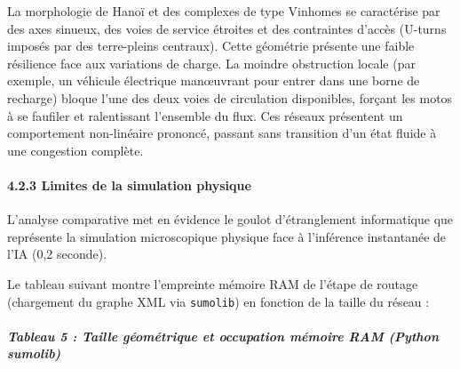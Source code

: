 \documentclass[10pt, a4paper]{article}
\begin{document}
La morphologie de Hanoï et des complexes de type Vinhomes se caractérise
par des axes sinueux, des voies de service étroites et des contraintes
d'accès (U-turns imposés par des terre-pleins centraux). Cette géométrie
présente une faible résilience face aux variations de charge. La moindre
obstruction locale (par exemple, un véhicule électrique manœuvrant pour
entrer dans une borne de recharge) bloque l'une des deux voies de
circulation disponibles, forçant les motos à se faufiler et ralentissant
l'ensemble du flux. Ces réseaux présentent un comportement non-linéaire
prononcé, passant sans transition d'un état fluide à une congestion
complète.

\paragraph{4.2.3 Limites de la simulation
physique}\label{limites-de-la-simulation-physique}

L'analyse comparative met en évidence le goulot d'étranglement
informatique que représente la simulation microscopique physique face à
l'inférence instantanée de l'IA (0,2 seconde).

Le tableau suivant montre l'empreinte mémoire RAM de l'étape de routage
(chargement du graphe XML via \texttt{sumolib}) en fonction de la taille
du réseau :

\subparagraph{Tableau 5 : Taille géométrique et occupation mémoire RAM
(Python
sumolib)}\label{tableau-5-taille-guxe9omuxe9trique-et-occupation-muxe9moire-ram-python-sumolib}
\end{document}
